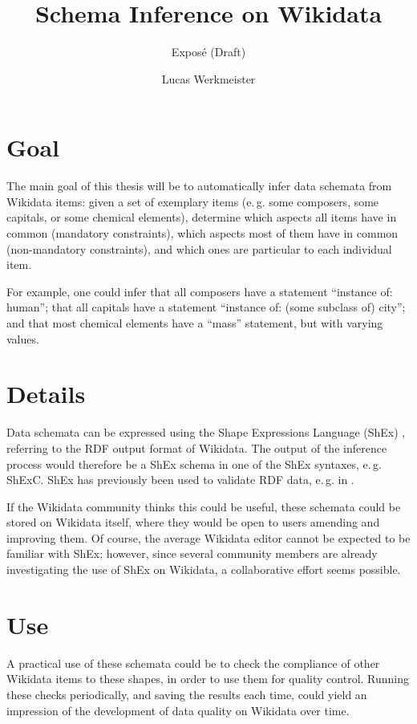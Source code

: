 \documentclass{scrartcl}
\title{Schema Inference on Wikidata}
\subtitle{Exposé (Draft)}
\author{Lucas Werkmeister}
\begin{document}
\maketitle

\section{Goal}

The main goal of this thesis will be to automatically infer data schemata from Wikidata items:
given a set of exemplary items (e.\,g. some composers, some capitals, or some chemical elements),
determine which aspects all items have in common (mandatory constraints),
which aspects most of them have in common (non-mandatory constraints),
and which ones are particular to each individual item.

For example, one could infer that all composers have a statement “instance of: human”;
that all capitals have a statement “instance of: (some subclass of) city”;
and that most chemical elements have a “mass” statement, but with varying values.

\section{Details}

Data schemata can be expressed using the Shape Expressions Language (ShEx) \cite{shex},
referring to the RDF output format of Wikidata.
The output of the inference process would therefore be a ShEx schema in one of the ShEx syntaxes, e.\,g. ShExC.
ShEx has previously been used to validate RDF data, e.\,g. in \cite{SOLBRIG201790}.

If the Wikidata community thinks this could be useful, these schemata could be stored on Wikidata itself,
where they would be open to users amending and improving them.
Of course, the average Wikidata editor cannot be expected to be familiar with ShEx;
however, since several community members are already investigating the use of ShEx on Wikidata, a collaborative effort seems possible.

\section{Use}

A practical use of these schemata could be to check the compliance of other Wikidata items to these shapes,
in order to use them for quality control.
Running these checks periodically, and saving the results each time,
could yield an impression of the development of data quality on Wikidata over time.
\end{document}
